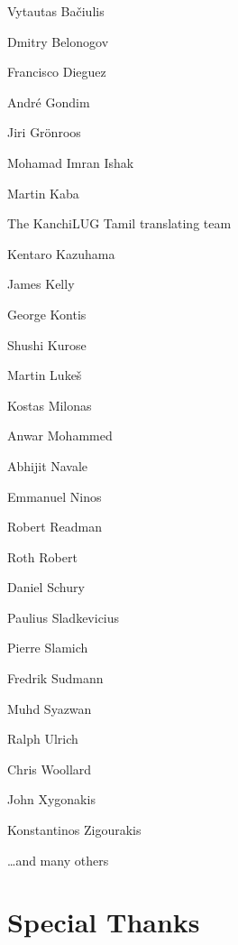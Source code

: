 \vspace{-1\baselineskip}
\begin{credits}
  \item Vytautas Bačiulis
  \item Dmitry Belonogov
  \item Francisco Dieguez
  \item André Gondim
  \item Jiri Grönroos
  \item Mohamad Imran Ishak
  \item Martin Kaba
  \item The KanchiLUG Tamil translating team
  \item Kentaro Kazuhama
  \item James Kelly
  \item George Kontis
  \item Shushi Kurose
  \item Martin Lukeš
  \item Kostas Milonas
  \item Anwar Mohammed
  \item Abhijit Navale
  \item Emmanuel Ninos
  \item Robert Readman
  \item Roth Robert
  \item Daniel Schury
  \item Paulius Sladkevicius
  \item Pierre Slamich
  \item Fredrik Sudmann
  \item Muhd Syazwan
  \item Ralph Ulrich
  \item Chris Woollard
  \item John Xygonakis
  \item Konstantinos Zigourakis
  \item \ldots and many others
\end{credits}

\section{Special Thanks}


